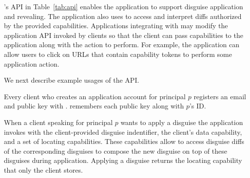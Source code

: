 

\sys's API in Table~\ref{tab:api} enables the application to support disguise application and
revealing.
%
The application also uses \sys to access and interpret diffs authorized by the provided
capabilities.  Applications integrating with \sys may modify the application API invoked by clients
so that the client can pass capabilities to the application along with the action to perform.
For example, the application can allow users to click on URLs that contain capability tokens to  
perform some application action.

We next describe example usages of the API.

Every client who creates an application account for principal $p$ registers an email and public key with \sys.
\sys remembers each public key  along with $p$'s ID.

When a client speaking for principal $p$ wants to apply a disguise 
the application invokes  with the client-provided disguise indentifier, the
client's data capability, and a set
of locating capabilities. These capabilities allow \sys to access disguise diffs of
the corresponding disguises to compose the new disguise on top of these disguises during
application. Applying a disguise returns the locating capability  that
only the client stores. 

